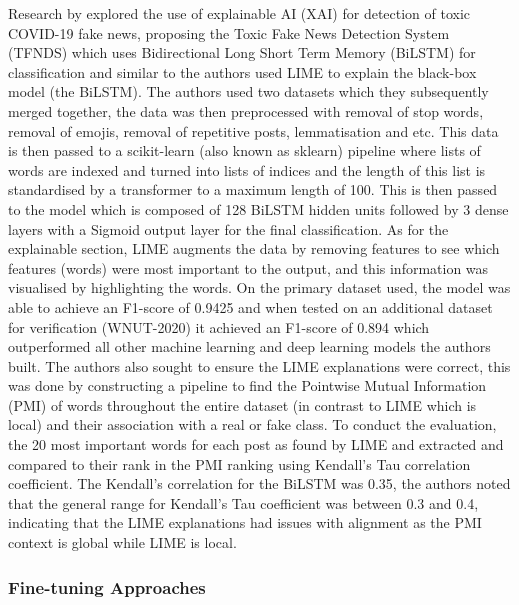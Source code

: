 \documentclass[stu,12pt,floatsintext,donotrepeattitle]{apa7}
\begin{document}
Research by \textcite{xai-bilstm} explored the use of explainable AI (XAI) for detection of toxic COVID-19 fake news, proposing the Toxic Fake News Detection System (TFNDS) which uses Bidirectional Long Short Term Memory (BiLSTM) for classification and similar to \textcite{Xflag} the authors used LIME to explain the black-box model (the BiLSTM). The authors used two datasets which they subsequently merged together, the data was then preprocessed with removal of stop words, removal of emojis, removal of repetitive posts, lemmatisation and etc. This data is then passed to a scikit-learn (also known as sklearn) pipeline where lists of words are indexed and turned into lists of indices and the length of this list is standardised by a transformer to a maximum length of 100. This is then passed to the model which is composed of 128 BiLSTM hidden units followed by 3 dense layers with a Sigmoid output layer for the final classification. As for the explainable section, LIME augments the data by removing features to see which features (words) were most important to the output, and this information was visualised by highlighting the words. On the primary dataset used, the model was able to achieve an F1-score of 0.9425 and when tested on an additional dataset for verification (WNUT-2020) it achieved an F1-score of 0.894 which outperformed all other machine learning and deep learning models the authors built. The authors also sought to ensure the LIME explanations were correct, this was done by constructing a pipeline to find the Pointwise Mutual Information (PMI) of words throughout the entire dataset (in contrast to LIME which is local) and their association with a real or fake class. To conduct the evaluation, the 20 most important words for each post as found by LIME and extracted and compared to their rank in the PMI ranking using Kendall's Tau correlation coefficient. The Kendall's correlation for the BiLSTM was 0.35, the authors noted that the general range for Kendall's Tau coefficient was between 0.3 and 0.4, indicating that the LIME explanations had issues with alignment as the PMI context is global while LIME is local. 


\subsubsection{Fine-tuning Approaches}
\end{document}
